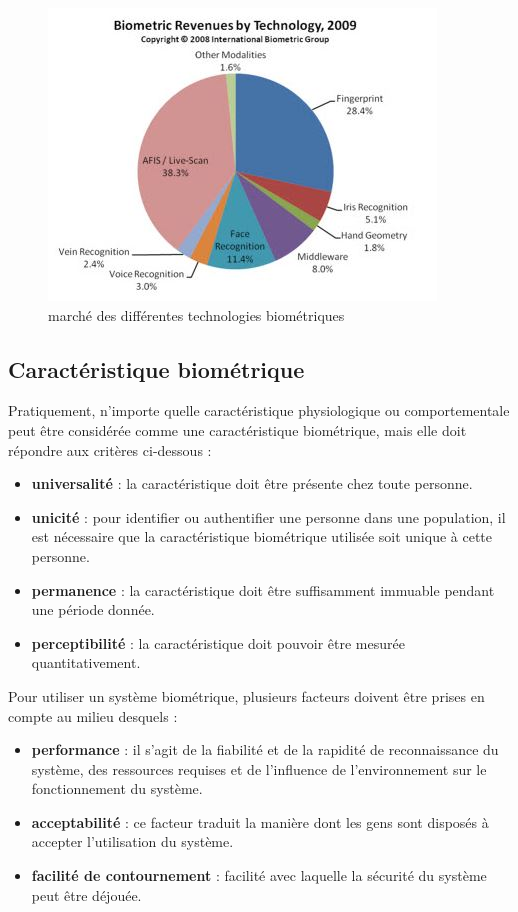 \begin{figure}[htbp]
	\centering
		\includegraphics{market.JPG}
	\caption{marché des différentes technologies biométriques}
	\label{fig:market}
\end{figure}

\subsection{Caractéristique biométrique}
 Pratiquement, n'importe quelle caractéristique physiologique ou comportementale peut être considérée comme une caractéristique biométrique, mais elle doit répondre aux critères ci-dessous \citep{Lal} : 
\begin{itemize}
	\item [\textbullet] \textbf{universalité} : la caractéristique doit être présente chez toute personne.
	\item [\textbullet] \textbf{unicité} : pour identifier ou authentifier une personne dans une population, il est nécessaire que la caractéristique biométrique utilisée soit unique à cette personne.
	\item [\textbullet] \textbf{permanence} : la caractéristique doit être suffisamment immuable pendant une période donnée. 
	\item [\textbullet] \textbf{perceptibilité} : la caractéristique doit pouvoir être mesurée quantitativement.  
\end{itemize}
Pour utiliser un système biométrique, plusieurs facteurs doivent être prises en compte au milieu desquels :
 
 \begin{itemize}
	 \item [\textbullet] \textbf{performance} : il s'agit de la fiabilité et de la rapidité de reconnaissance du système, des ressources requises et de l'influence de l'environnement sur le fonctionnement du système.
	\item [\textbullet] \textbf{acceptabilité} : ce facteur traduit la manière dont les gens sont disposés à accepter l'utilisation du système. 
	\item [\textbullet] \textbf{facilité de contournement} : facilité avec laquelle la sécurité du système peut être déjouée.
 \end{itemize}


